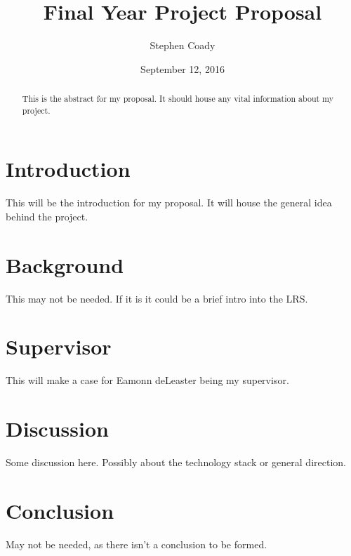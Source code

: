\documentclass{article}
\author{Stephen Coady}
\title{Final Year Project Proposal}
\date{September 12, 2016}
\begin{document}


\newpage

\begin{abstract}
This is the abstract for my proposal. It should house any vital information about my project.
\end{abstract}

\newpage

\tableofcontents

\newpage

\section{Introduction}

This will be the introduction for my proposal. It will house the general idea behind the project.

\section{Background}

This may not be needed. If it is it could be a brief intro into the LRS.

\section{Supervisor}

This will make a case for Eamonn deLeaster being my supervisor.

\section{Discussion}

Some discussion here. Possibly about the technology stack or general direction.

\section{Conclusion}

May not be needed, as there isn't a conclusion to be formed. 
\end{document}
